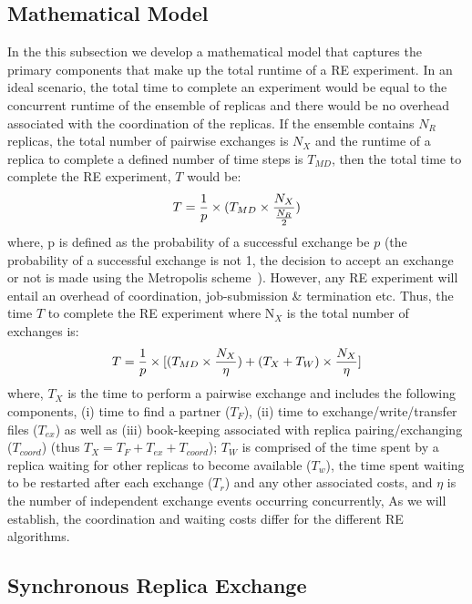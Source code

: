 \documentclass{rspublic}
\newcommand{\alnote}[1]{ {\textcolor{blue} { ***andre: #1 }}}
\newcommand{\alnote}[1]{}
\begin{document}
\subsection{Mathematical Model}

In the this subsection we develop a mathematical model that captures
the primary components that make up the total runtime of a RE
experiment. In an ideal scenario, the total time to complete an
experiment would be equal to the concurrent runtime of the ensemble of
replicas and there would be no overhead associated with the
coordination of the replicas.  If the ensemble contains $N_R$
replicas, the total number of pairwise exchanges is $N_X$ and the
runtime of a replica to complete a defined number of time steps is
$T_{MD}$, then the total time to complete the RE experiment, $T$ would
be:
\begin{eqnarray}
T = {1\over p} \times (T_{MD} \times  {N_X \over {N_R \over 2}}) 
\label{eq:totaltime}
\end{eqnarray}
where, p is defined as the probability of a successful exchange be $p$
(the probability of a successful exchange is not 1, the
decision to accept an exchange or not is made using the
Metropolis scheme~\citep{metropolis:1087}). However, any RE experiment will entail an overhead
of coordination, job-submission \& termination etc. Thus, the time $T$
to complete the RE experiment where N$_X$ is the total number of
exchanges is:
\begin{eqnarray}
  T = {1\over p} \times [(T_{MD} \times  {N_X \over {\eta}}) +
  {(T_{X} + T_{W})} \times {N_X \over \eta}]
\label{eq:totaltime}
\end{eqnarray}
where, $T_{X}$ is the time to perform a pairwise exchange and includes
the following components, (i) time to find a partner ($T_F$), (ii)
time to exchange/write/transfer files ($T_{ex}$) as well as (iii)
book-keeping associated with replica pairing/exchanging ($T_{coord}$)
(thus $T_{X} = T_{F} + T_{ex}+T_{coord}$); 
$T_W$ is comprised of the time spent by a replica waiting for other
replicas to become available ($T_w$), the time spent waiting to be restarted
after each exchange ($T_r$) and any other associated costs, and $\eta$
is the number of independent exchange events occurring concurrently,
As we will establish, the coordination and waiting costs differ for
the different RE algorithms.

\subsection{Synchronous Replica Exchange}
\end{document}
